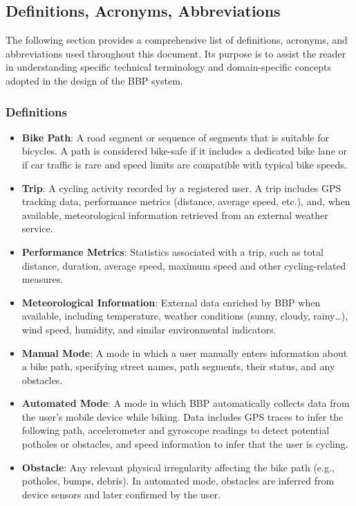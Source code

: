 \subsection{Definitions, Acronyms, Abbreviations}
The following section provides a comprehensive list of definitions, acronyms, and abbreviations used throughout this document. Its purpose is to assist the reader in understanding specific technical terminology and domain-specific concepts adopted in the design of the BBP system.

\subsubsection{Definitions}
\begin{itemize}
    \item \textbf{Bike Path}: A road segment or sequence of segments that is suitable for bicycles. A path is considered bike-safe if it includes a dedicated bike lane or if car traffic is rare and speed limits are compatible with typical bike speeds.
    \item \textbf{Trip}: A cycling activity recorded by a registered user. A trip includes GPS tracking data, performance metrics (distance, average speed, etc.), and, when available, meteorological information retrieved from an external weather service.
    \item \textbf{Performance Metrics}: Statistics associated with a trip, such as total distance, duration, average speed, maximum speed and other cycling-related measures.
    \item \textbf{Meteorological Information}: External data enriched by BBP when available, including temperature, weather conditions (sunny, cloudy, rainy…), wind speed, humidity, and similar environmental indicators.
    \item \textbf{Manual Mode}: A mode in which a user manually enters information about a bike path, specifying street names, path segments, their status, and any obstacles.
    \item \textbf{Automated Mode}: A mode in which BBP automatically collects data from the user’s mobile device while biking. Data includes GPS traces to infer the following path, accelerometer and gyroscope readings to detect potential potholes or obstacles, and speed information to infer that the user is cycling.
    \item \textbf{Obstacle}: Any relevant physical irregularity affecting the bike path (e.g., potholes, bumps, debris). In automated mode, obstacles are inferred from device sensors and later confirmed by the user.

\end{itemize}
